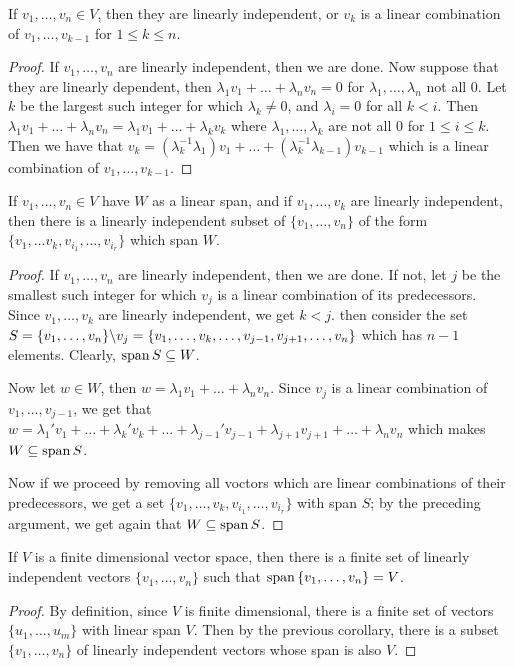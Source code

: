 \begin{theorem}
    If $ v_1, \dots, v_n \in V$, then they are linearly independent, or $v_k$ is
    a linear combination of  $ v_1, \dots, v_{k-1}$ for $1 \leq k \leq n$.
\end{theorem}
\begin{proof}
    If $ v_1 ,\dots, v_n$ are linearly independent, then we are done. Now
    suppose that they are linearly dependent, then
    $\lambda_1v_1+\dots+\lambda_nv_n=0$ for $\lambda_1, \dots, \lambda_n$ not
    all $0$. Let  $k$ be the largest such integer for which  $\lambda_k \neq 0$,
    and  $\lambda_i=0$ for all  $k<i$. Then  $\lambda_1v_1+\dots+\lambda_nv_n=
    \lambda_1v_1+\dots+\lambda_kv_k$ where $\lambda_1, \dots, \lambda_k$ are not
    all $0$ for  $1 \leq i \leq k$. Then we have that
    $v_k=(\lambda_k^{-1}\lambda_1)v_1+\dots+(\lambda_k^{-1}\lambda_{k-1})v_{k-1}$
    which is a linear combination of $ v_1, \dots, v_{k-1}$.
\end{proof}
\begin{corollary}
    If $ v_1, \dots, v_n \in V$ have $W$ as a linear span, and if  $ v_1, \dots,
    v_k$ are linearly independent, then there is a linearly independent subset
    of $\{v_1, \dots, v_n\}$ of the form $\{v_1, \dots v_k,v_{i_1}, \dots,
    v_{i_r}\}$ which span $W$.
\end{corollary}
\begin{proof}
    If $ v_1, \dots, v_n$ are linearly independent, then we are done. If not,
    let $j$ be the smallest such integer for which  $v_j$ is a linear
    combination of its predecessors. Since  $ v_1, \dots, v_k$ are linearly
    independent, we get $k<j$. then consider the set  $S=\{v_1, \dots,
    v_n\} \backslash v_j=\{v_1, \dots, v_k, \dots, v_{j-1},v_{j+1}, \dots, v_n\}$ which
    has $n-1$ elements. Clearly,  $\operatorname{span}{S} \subseteq W$.

    Now let $w \in W$, then  $w=\lambda_1v_1+\dots+\lambda_nv_n$. Since $v_j$ is
    a linear combination of  $ v_1, \dots, v_{j-1}$, we get that
    $w=\lambda_1'v_1+\dots+\lambda_k'v_k+\dots+\lambda_{j-1}'v_{j-1}+\lambda_{j+1}v_{j+1}+\dots+\lambda_nv_n$
    which makes $W \subseteq \operatorname{span}{S}$.

    Now if we proceed by removing all voctors which are linear combinations of
    their predecessors, we get a set $\{v_1, \dots, v_k,v_{i_1}, \dots,
    v_{i_r}\}$ with span $S$; by the preceding argument, we get again that
    $W \subseteq \operatorname{span}{S}$.
\end{proof}
\begin{corollary}
    If $V$ is a finite dimensional vector space, then there is a finite set of
    linearly independent vectors  $\{v_1, \dots, v_n\}$ such that $\operatorname{span}{\{v_1,
    \dots, v_n\}}=V$.
\end{corollary}
\begin{proof}
    By definition, since $V$ is finite dimensional, there is a finite set of
    vectors  $\{u_1, \dots, u_m\}$ with linear span $V$. Then by the previous
    corollary, there is a subset  $\{v_1, \dots, v_n\}$ of linearly independent
    vectors whose span is also $V$.
\end{proof}

